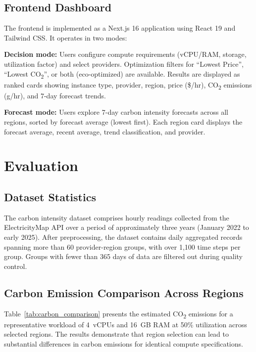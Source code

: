 \documentclass[conference]{IEEEtran}
\begin{document}
\subsection{Frontend Dashboard}

The frontend is implemented as a Next.js 16 application using React 19 and Tailwind CSS. It operates in two modes:

\textbf{Decision mode:} Users configure compute requirements (vCPU/RAM, storage, utilization factor) and select providers. Optimization filters for ``Lowest Price'', ``Lowest CO\textsubscript{2}'', or both (eco-optimized) are available. Results are displayed as ranked cards showing instance type, provider, region, price (\$/hr), CO\textsubscript{2} emissions (g/hr), and 7-day forecast trends.

\textbf{Forecast mode:} Users explore 7-day carbon intensity forecasts across all regions, sorted by forecast average (lowest first). Each region card displays the forecast average, recent average, trend classification, and provider.

\section{Evaluation}

\subsection{Dataset Statistics}

The carbon intensity dataset comprises hourly readings collected from the ElectricityMap API over a period of approximately three years (January 2022 to early 2025). After preprocessing, the dataset contains daily aggregated records spanning more than 60 provider-region groups, with over 1,100 time steps per group. Groups with fewer than 365 days of data are filtered out during quality control.

\subsection{Carbon Emission Comparison Across Regions}

Table~\ref{tab:carbon_comparison} presents the estimated CO\textsubscript{2} emissions for a representative workload of 4~vCPUs and 16~GB RAM at 50\% utilization across selected regions. The results demonstrate that region selection can lead to substantial differences in carbon emissions for identical compute specifications.
\end{document}
